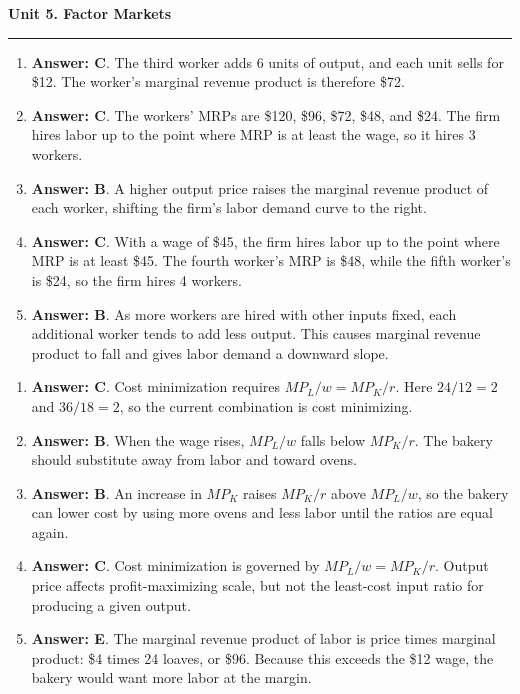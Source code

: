 \documentclass[10pt]{article}
\newcommand{\unitheader}[2]{%
  \vspace{0.35em}
  {\Large\bfseries Unit #1. #2\par}
  \vspace{0.2em}
  \hrule
  \vspace{0.55em}
}
\begin{document}
\unitheader{5}{Factor Markets}
\begin{enumerate}[resume*=aps, leftmargin=*, itemsep=0.6em, topsep=0.2em, parsep=0pt]
\item \textbf{Answer: C}. The third worker adds 6 units of output, and each unit sells for \$12. The worker's marginal revenue product is therefore \$72.
\item \textbf{Answer: C}. The workers' MRPs are \$120, \$96, \$72, \$48, and \$24. The firm hires labor up to the point where MRP is at least the wage, so it hires 3 workers.
\item \textbf{Answer: B}. A higher output price raises the marginal revenue product of each worker, shifting the firm's labor demand curve to the right.
\item \textbf{Answer: C}. With a wage of \$45, the firm hires labor up to the point where MRP is at least \$45. The fourth worker's MRP is \$48, while the fifth worker's is \$24, so the firm hires 4 workers.
\item \textbf{Answer: B}. As more workers are hired with other inputs fixed, each additional worker tends to add less output. This causes marginal revenue product to fall and gives labor demand a downward slope.
\end{enumerate}
\begin{enumerate}[resume*=aps, leftmargin=*, itemsep=0.6em, topsep=0.2em, parsep=0pt]
\item \textbf{Answer: C}. Cost minimization requires $MP_L/w = MP_K/r$. Here $24/12 = 2$ and $36/18 = 2$, so the current combination is cost minimizing.
\item \textbf{Answer: B}. When the wage rises, $MP_L/w$ falls below $MP_K/r$. The bakery should substitute away from labor and toward ovens.
\item \textbf{Answer: B}. An increase in $MP_K$ raises $MP_K/r$ above $MP_L/w$, so the bakery can lower cost by using more ovens and less labor until the ratios are equal again.
\item \textbf{Answer: C}. Cost minimization is governed by $MP_L/w = MP_K/r$. Output price affects profit-maximizing scale, but not the least-cost input ratio for producing a given output.
\item \textbf{Answer: E}. The marginal revenue product of labor is price times marginal product: \$4 times 24 loaves, or \$96. Because this exceeds the \$12 wage, the bakery would want more labor at the margin.
\end{enumerate}
\end{document}
